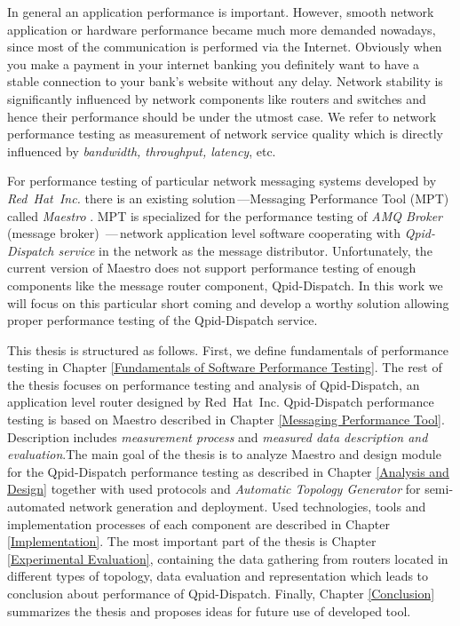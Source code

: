 In general an application performance is important. However, smooth network application or hardware performance became much more demanded nowadays, since most of the communication is performed via the Internet.  Obviously when you make a payment in your internet banking you definitely want to have a stable connection to your bank's website without any delay. Network stability is significantly influenced by network components like routers and switches and hence their performance should be under the utmost case. We refer to network performance testing as measurement of network service quality which is directly influenced by \emph{bandwidth, throughput, latency}, etc.

For performance testing of particular network messaging systems developed by \emph{Red~Hat~Inc.} there is an existing solution\,---Messaging Performance Tool (MPT) called \emph{Maestro} \cite{ORPISKE:MSGPT}. MPT is specialized for the performance testing of \emph{AMQ Broker} (message broker) \cite{RH:Broker}\,---\,network application level software cooperating with \emph{Qpid-Dispatch service} \cite{RH:Interconnect} in the network as the message distributor. Unfortunately, the current version of Maestro does not support performance testing of enough components like the message router component, Qpid-Dispatch. In this work we will focus on this particular short coming and develop a worthy solution allowing proper performance testing of the Qpid-Dispatch service.

This thesis is structured as follows. First, we define fundamentals of performance testing in Chapter \ref{Fundamentals of Software Performance Testing}. The rest of the thesis focuses on performance testing and analysis of Qpid-Dispatch, an application level router designed by Red~Hat~Inc. Qpid-Dispatch performance testing is based on Maestro described in Chapter \ref{Messaging Performance Tool}. Description includes \emph{measurement process} and \emph{measured data description and evaluation}.The main goal of the thesis is to analyze Maestro and design module for the Qpid-Dispatch performance testing as described in Chapter \ref{Analysis and Design} together with used protocols and \emph{Automatic Topology Generator} for semi-automated network generation and deployment. Used technologies, tools and  implementation processes of each component are described in Chapter \ref{Implementation}. The most important part of the thesis is Chapter \ref{Experimental Evaluation}, containing the data gathering  from routers located in different types of topology, data evaluation and representation which leads to conclusion about performance of Qpid-Dispatch. Finally, Chapter \ref{Conclusion} summarizes the thesis and proposes ideas for future use of developed tool.

